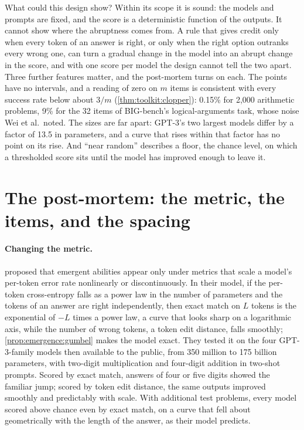 \begin{refsection}
What could this design show? Within its scope it is sound: the models and prompts are fixed, and the score is a deterministic function of the outputs. It cannot show where the abruptness comes from. A rule that gives credit only when every token of an answer is right, or only when the right option outranks every wrong one, can turn a gradual change in the model into an abrupt change in the score, and with one score per model the design cannot tell the two apart. Three further features matter, and the post-mortem turns on each. The points have no intervals, and a reading of zero on $m$ items is consistent with every success rate below about $3/m$ (\cref{thm:toolkit:clopper}): 0.15\% for 2,000 arithmetic problems, 9\% for the 32 items of BIG-bench's logical-arguments task, whose noise Wei et al.\ noted. The sizes are far apart: GPT-3's two largest models differ by a factor of 13.5 in parameters, and a curve that rises within that factor has no point on its rise. And ``near random'' describes a floor, the chance level, on which a thresholded score sits until the model has improved enough to leave it.

\section{The post-mortem: the metric, the items, and the spacing}\label{sec:emergence:postmortem}

\paragraph{Changing the metric.} \Textcite{SchaefferMirandaKoyejo2023} proposed that emergent abilities appear only under metrics that scale a model's per-token error rate nonlinearly or discontinuously. In their model, if the per-token cross-entropy falls as a power law in the number of parameters and the tokens of an answer are right independently, then exact match on $L$ tokens is the exponential of $-L$ times a power law, a curve that looks sharp on a logarithmic axis, while the number of wrong tokens, a token edit distance, falls smoothly; \cref{prop:emergence:gumbel} makes the model exact. They tested it on the four GPT-3-family models then available to the public, from 350 million to 175 billion parameters, with two-digit multiplication and four-digit addition in two-shot prompts. Scored by exact match, answers of four or five digits showed the familiar jump; scored by token edit distance, the same outputs improved smoothly and predictably with scale. With additional test problems, every model scored above chance even by exact match, on a curve that fell about geometrically with the length of the answer, as their model predicts.


\end{refsection}
